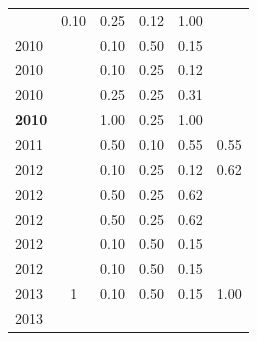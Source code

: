 \begin{table}[H]
\begin{tabular}{| l | c | c | c | c | c |}
          &
          0.10
          &
          0.25
          &
          0.12
          &
            {\color{blue} 1.00}
          \\
            2010
          &
          
          &
          0.10
          &
          0.50
          &
          0.15
          &
          \\
            2010
          &
          
          &
          0.10
          &
          0.25
          &
          0.12
          &
          \\
            2010
          &
          
          &
          0.25
          &
          0.25
          &
          0.31
          &
          \\
            {\bf 2010}
          &
          
          &
          1.00
          &
          0.25
          &
          1.00
          &
          \\
\hline
            2011
          &
          
          &
          0.50
          &
          0.10
          &
          0.55
          &
            {\color{blue} 0.55}
          \\
\hline
            2012
          &
          
          &
          0.10
          &
          0.25
          &
          0.12
          &
            {\color{blue} 0.62}
          \\
            2012
          &
          
          &
          0.50
          &
          0.25
          &
          0.62
          &
          \\
            2012
          &
          
          &
          0.50
          &
          0.25
          &
          0.62
          &
          \\
            2012
          &
          
          &
          0.10
          &
          0.50
          &
          0.15
          &
          \\
            2012
          &
          
          &
          0.10
          &
          0.50
          &
          0.15
          &
          \\
\hline
            2013
          &
          1
          &
          0.10
          &
          0.50
          &
          0.15
          &
            {\color{blue} 1.00}
          \\
            2013
          &
          

\end{tabular}
\end{table}
